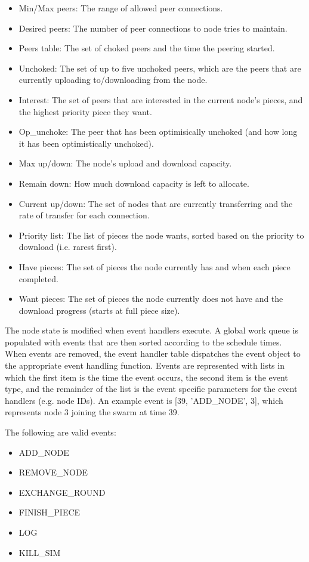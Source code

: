 \begin{itemize}
\item Min/Max peers: The range of allowed peer connections.
\item Desired peers: The number of peer connections to node tries to maintain.
\item Peers table: The set of choked peers and the time the peering started.
\item Unchoked: The set of up to five unchoked peers, which are the peers that are currently uploading to/downloading from the node.
\item Interest: The set of peers that are interested in the current node's pieces, and the highest priority piece they want.
\item Op\_unchoke: The peer that has been optimisically unchoked (and how long it has been optimistically unchoked).
\item Max up/down: The node's upload and download capacity.
\item Remain down: How much download capacity is left to allocate.
\item Current up/down: The set of nodes that are currently transferring and the rate of transfer for each connection.
\item Priority list: The list of pieces the node wants, sorted based on the priority to download (i.e. rarest first).
\item Have pieces: The set of pieces the node currently has and when each piece completed.
\item Want pieces: The set of pieces the node currently does not have and the download progress (starts at full piece size).
\end{itemize}

The node state is modified when event handlers execute.
A global work queue is populated with events that are
then sorted according to the schedule times. When events are removed,
the event handler table dispatches the event object to the appropriate
event handling function. Events are represented with lists in which the first
item is the time the event occurs, the second item is the event type, and the remainder
of the list is the event specific parameters for the event handlers (e.g. node IDs).
An example event is [39, 'ADD\_NODE', 3], which represents node 3 joining the swarm at
time 39.

The following are valid events:

\begin{itemize}
\item ADD\_NODE
\item REMOVE\_NODE
\item EXCHANGE\_ROUND
\item FINISH\_PIECE
\item LOG
\item KILL\_SIM
\end{itemize}

